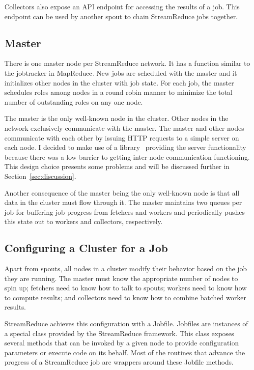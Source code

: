 \documentclass[12pt,twocolumn]{article}
\begin{document}
Collectors also expose an API endpoint for accessing the results of a job. This endpoint
can be used by another spout to chain StreamReduce jobs together.
\subsection{Master}
\label{sec:master}
There is one master node per StreamReduce network. It has a function similar to the jobtracker in
MapReduce. New jobs are scheduled with the master and it initializes other nodes in the
cluster with job state. For each job, the master schedules roles among nodes in a round robin
manner to minimize the total number of outstanding roles on any one node.

The master is the only well-known node in the cluster. Other nodes in the network exclusively
communicate with the master. The master and other nodes communicate with each other by issuing
HTTP requests to a simple server on each node. I decided to make use of a library~\cite{sinatrarb}
providing the server functionality because there was a low barrier to getting inter-node
communication functioning. This design choice presents some problems and will be discussed
further in Section~\ref{sec:discussion}.

Another consequence of the master being the only well-known node is that all data in the
cluster must flow through it. The master maintains two queues per job for buffering job
progress from fetchers and workers and periodically pushes this state out to workers and
collectors, respectively.
\subsection{Configuring a Cluster for a Job}
\label{sec:jobfile}
Apart from spouts, all nodes in a cluster modify their behavior based on the job they are
running. The master must know the appropriate number of nodes to spin up; fetchers need to
know how to talk to spouts; workers need to know how to compute results; and collectors need
to know how to combine batched worker results.

StreamReduce achieves this configuration with a Jobfile. Jobfiles are instances of a special class
provided by the StreamReduce framework. This class exposes several methods that can be invoked by a
given node to provide configuration parameters or execute code on its behalf. Most of the
routines that advance the progress of a StreamReduce job are wrappers around these Jobfile methods.
\end{document}

